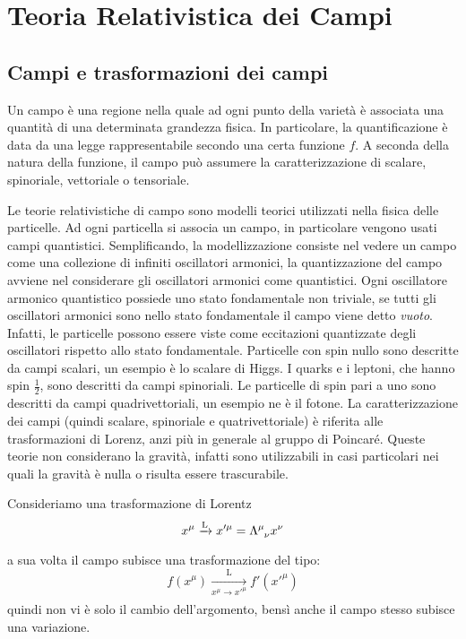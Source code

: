 \section{Teoria Relativistica dei Campi}
\subsection{Campi e trasformazioni dei campi}
Un campo è una regione nella quale ad ogni punto della varietà è associata una quantità di una determinata grandezza fisica. In particolare, la quantificazione è data da una legge rappresentabile secondo una certa funzione $f$. A seconda della natura della funzione, il campo può assumere la caratterizzazione di scalare, spinoriale, vettoriale o tensoriale.

Le teorie relativistiche di campo sono modelli teorici utilizzati nella fisica delle particelle. Ad ogni particella si associa un campo, in particolare vengono usati campi quantistici. Semplificando, la modellizzazione consiste nel vedere un campo come una collezione di infiniti oscillatori armonici, la quantizzazione del campo avviene nel considerare gli oscillatori armonici come quantistici. Ogni oscillatore armonico quantistico possiede uno stato fondamentale non triviale, se tutti gli oscillatori armonici sono nello stato fondamentale il campo viene detto \textit{vuoto}. Infatti, le particelle possono essere viste come eccitazioni quantizzate degli oscillatori rispetto allo stato fondamentale. Particelle con spin nullo sono descritte da campi scalari, un esempio è lo scalare di Higgs. I quarks e i leptoni, che hanno spin $\frac{1}{2}$, sono descritti da campi spinoriali. Le particelle di spin pari a uno sono descritti da campi quadrivettoriali, un esempio ne è il fotone. La caratterizzazione dei campi (quindi scalare, spinoriale e quatrivettoriale) è riferita alle trasformazioni di Lorenz, anzi più in generale al gruppo di Poincaré. Queste teorie non considerano la gravità, infatti sono utilizzabili in casi particolari nei quali la gravità è nulla o risulta essere trascurabile.

Consideriamo una trasformazione di Lorentz
\begin{equation}
  x^\mu\xrightarrow[\text{}]{\text{L}}x'^{\mu}=\Lambda\indices{^\mu_\nu} x^{\nu} 
\end{equation}
a sua volta il campo subisce una trasformazione del tipo:
\begin{equation}
  f(x^\mu)\xrightarrow[\text{$x^\mu\xrightarrow[\text{}]{\text{}}x'^{\mu}$}]{\text{L}}f'(x'^{\mu})
\end{equation}
quindi non vi è solo il cambio dell'argomento, bensì anche il campo stesso subisce una variazione.

